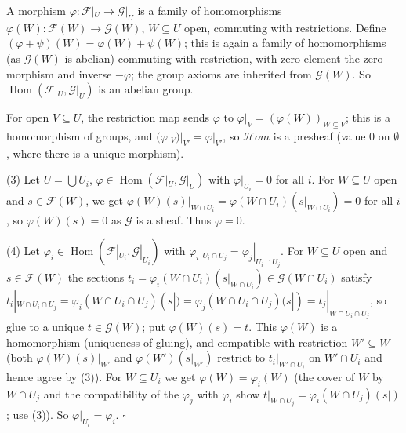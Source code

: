 \documentclass[11pt]{article}
\begin{document}
\pf
A morphism $\varphi\colon\mathcal F|_U\to\mathcal G|_U$ is a family of homomorphisms $\varphi(W)\colon\mathcal F(W)\to\mathcal G(W)$, $W\subseteq U$ open, commuting with restrictions. Define $(\varphi+\psi)(W)=\varphi(W)+\psi(W)$; this is again a family of homomorphisms (as $\mathcal G(W)$ is abelian) commuting with restriction, with zero element the zero morphism and inverse $-\varphi$; the group axioms are inherited from $\mathcal G(W)$. So $\operatorname{Hom}(\mathcal F|_U,\mathcal G|_U)$ is an abelian group.

For open $V\subseteq U$, the restriction map sends $\varphi$ to $\varphi|_V=(\varphi(W))_{W\subseteq V}$; this is a homomorphism of groups, and $(\varphi|_V)|_{V'}=\varphi|_{V'}$, so $\mathcal Hom$ is a presheaf (value $0$ on $\emptyset$, where there is a unique morphism).

(3) Let $U=\bigcup U_i$, $\varphi\in\operatorname{Hom}(\mathcal F|_U,\mathcal G|_U)$ with $\varphi|_{U_i}=0$ for all $i$. For $W\subseteq U$ open and $s\in\mathcal F(W)$, we get $\varphi(W)(s)|_{W\cap U_i}=\varphi(W\cap U_i)(s|_{W\cap U_i})=0$ for all $i$, so $\varphi(W)(s)=0$ as $\mathcal G$ is a sheaf. Thus $\varphi=0$.

(4) Let $\varphi_i\in\operatorname{Hom}(\mathcal F|_{U_i},\mathcal G|_{U_i})$ with $\varphi_i|_{U_i\cap U_j}=\varphi_j|_{U_i\cap U_j}$. For $W\subseteq U$ open and $s\in\mathcal F(W)$ the sections $t_i=\varphi_i(W\cap U_i)(s|_{W\cap U_i})\in\mathcal G(W\cap U_i)$ satisfy $t_i|_{W\cap U_i\cap U_j}=\varphi_i(W\cap U_i\cap U_j)(s|)=\varphi_j(W\cap U_i\cap U_j)(s|)=t_j|_{W\cap U_i\cap U_j}$, so glue to a unique $t\in\mathcal G(W)$; put $\varphi(W)(s)=t$. This $\varphi(W)$ is a homomorphism (uniqueness of gluing), and compatible with restriction $W'\subseteq W$ (both $\varphi(W)(s)|_{W'}$ and $\varphi(W')(s|_{W'})$ restrict to $t_i|_{W'\cap U_i}$ on $W'\cap U_i$ and hence agree by (3)). For $W\subseteq U_i$ we get $\varphi(W)=\varphi_i(W)$ (the cover of $W$ by $W\cap U_j$ and the compatibility of the $\varphi_j$ with $\varphi_i$ show $t|_{W\cap U_j}=\varphi_i(W\cap U_j)(s|)$; use (3)). So $\varphi|_{U_i}=\varphi_i$. \hfill$\square$
\end{document}
